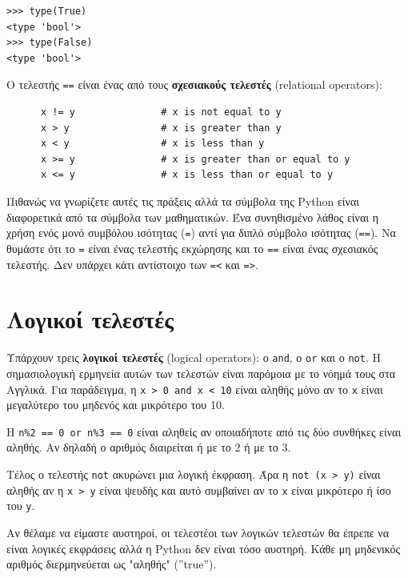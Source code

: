 \documentclass[10pt]{book}
\begin{document}
\begin{verbatim}
>>> type(True)
<type 'bool'>
>>> type(False)
<type 'bool'>
\end{verbatim}
%

Ο τελεστής {\tt ==} είναι ένας από τους {\bf σχεσιακούς τελεστές} (relational operators):

\begin{verbatim}
      x != y               # x is not equal to y
      x > y                # x is greater than y
      x < y                # x is less than y
      x >= y               # x is greater than or equal to y
      x <= y               # x is less than or equal to y
\end{verbatim}
%

Πιθανώς να γνωρίζετε αυτές τις πράξεις αλλά τα σύμβολα της Python
είναι διαφορετικά από τα σύμβολα των μαθηματικών. Ένα συνηθισμένο λάθος είναι η χρήση ενός μονό συμβόλου ισότητας ({\tt =}) αντί για διπλό σύμβολο ισότητας ({\tt ==}). Να θυμάστε ότι το {\tt =} είναι ένας τελεστής εκχώρησης και το {\tt ==} είναι ένας σχεσιακός τελεστής. Δεν υπάρχει κάτι αντίστοιχο των {\tt =<} και {\tt =>}.


\section{Λογικοί τελεστές}

Υπάρχουν τρεις {\bf λογικοί τελεστές} (logical operators): ο {\tt and}, ο {\tt or} και ο {\tt not}. Η σημασιολογική ερμηνεία αυτών των τελεστών είναι παρόμοια με το νόημά τους στα Αγγλικά. Για παράδειγμα, η {\tt x > 0 and x < 10} είναι αληθής μόνο αν το {\tt x} είναι μεγαλύτερο του μηδενός και μικρότερο του 10.

Η {\tt n\%2 == 0 or n\%3 == 0} είναι αληθείς αν οποιαδήποτε από τις δύο συνθήκες είναι αληθής. Αν δηλαδή ο αριθμός διαιρείται ή με το 2 ή με το 3.

Τέλος ο τελεστής {\tt not} ακυρώνει μια λογική έκφραση. Άρα η {\tt not (x > y)} είναι αληθής αν η {\tt x > y} είναι ψευδής και αυτό συμβαίνει αν το {\tt x} είναι μικρότερο ή ίσο του {\tt y}.

Αν θέλαμε να είμαστε αυστηροί, οι τελεστέοι των λογικών τελεστών θα έπρεπε να είναι λογικές εκφράσεις αλλά η  Python δεν είναι τόσο αυστηρή. Κάθε μη μηδενικός αριθμός διερμηνεύεται ως "αληθής" (''true'').
\end{document}
